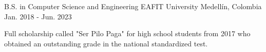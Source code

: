 

\begin{cventries}

  \cventry
    {B.S. in Computer Science and Engineering} %
    {EAFIT University} %
    {Medellín, Colombia} %
    {Jan. 2018 - Jun. 2023} %
    {
      \begin{cvitems} %
        \item {Full scholarship called "Ser Pilo Paga" for high school students from 2017 who
        obtained an outstanding grade in the national standardized test.}
      \end{cvitems}
    }

\end{cventries}
